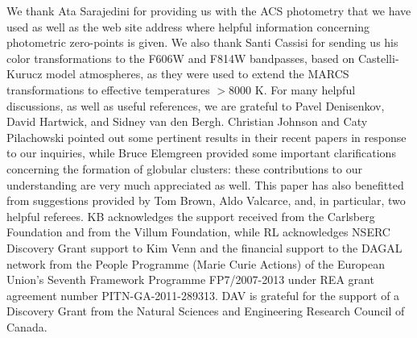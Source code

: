 \documentclass[12pt,preprint]{aastex}
\begin{document}




\acknowledgements
We thank Ata Sarajedini for providing us with the ACS photometry that we have
used as well as the web site address where helpful information concerning
photometric zero-points is given.  We also thank Santi Cassisi for sending us
his color transformations to the F606W and F814W bandpasses, based on
Castelli-Kurucz model atmospheres, as they were used to extend the MARCS
transformations to effective temperatures $> 8000$ K.  For many helpful
discussions, as well as useful references, we are grateful to Pavel Denisenkov,
David Hartwick, and Sidney van den Bergh.  Christian Johnson and Caty
Pilachowski pointed out some pertinent results in their recent papers in 
response to our inquiries, while Bruce Elemgreen provided some important
clarifications concerning the formation of globular clusters: these
contributions to our understanding are very much appreciated as well.  This
paper has also benefitted from suggestions provided by Tom Brown, Aldo Valcarce,
and, in particular, two helpful referees.  KB acknowledges the support received
from the Carlsberg Foundation and from the Villum Foundation, while RL
acknowledges NSERC Discovery Grant support to Kim Venn and the financial
support to the DAGAL network from the People Programme (Marie Curie Actions) of
the European Union's Seventh Framework Programme FP7/2007-2013 under REA grant
agreement number PITN-GA-2011-289313.  DAV is grateful for the support of a
Discovery Grant from the Natural Sciences and Engineering Research Council of
Canada.
 
\end{document}
